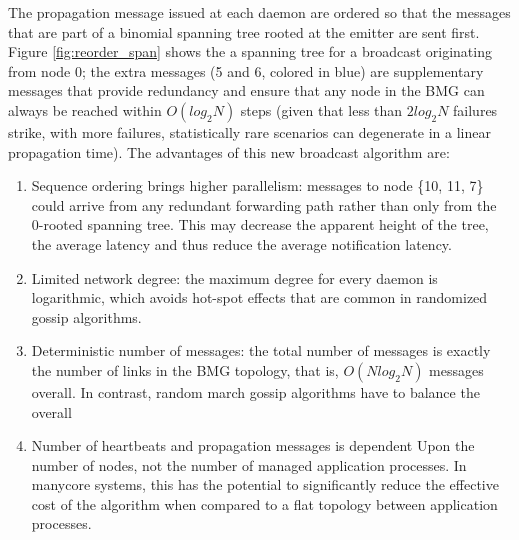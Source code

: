 \documentclass[sigconf]{acmart}
\begin{document}
The propagation message issued at each daemon are ordered so that the 
messages that are part of a binomial spanning tree rooted at the emitter
are sent first. Figure \ref{fig:reorder_span} shows the a spanning tree
for a broadcast originating from node 0; the extra messages (5 and 6, colored 
in blue) are supplementary messages that provide redundancy and ensure that
any node in the BMG can always be reached within $O(log_2 N)$ steps (given 
that less than $2 log_2 N$ failures strike, with more failures, 
statistically rare scenarios can degenerate in a linear propagation time).
The advantages of this new broadcast algorithm are:
\begin{enumerate}
  \item Sequence ordering brings higher parallelism: messages to node \{10, 11, 7\} could arrive from any redundant forwarding path rather than only from the 0-rooted spanning tree. This may decrease the apparent height of the tree, the average latency and thus reduce the average notification latency.
  \item Limited network degree: the maximum degree for every daemon is logarithmic, which avoids hot-spot effects that are common in randomized gossip algorithms. 
  \item Deterministic number of messages: the total number of messages is 
  exactly the number of links in the BMG topology, that is, $O(N log_2 N)$ 
  messages overall. In contrast, random march gossip algorithms have to 
  balance the overall
  \item Number of heartbeats and propagation messages is dependent Upon
  the number of nodes, not the number of managed application processes.
  In manycore systems, this has the potential to significantly reduce the 
  effective cost of the algorithm when compared to a flat topology between 
  application processes. 
\end{enumerate}
\end{document}
